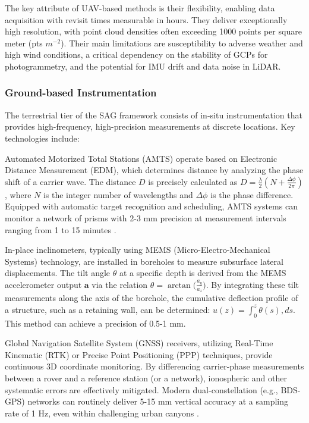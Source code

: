 \documentclass[preprint,11pt,authoryear,3p]{elsarticle}
\begin{document}
The key attribute of UAV-based methods is their flexibility, enabling data acquisition with revisit times measurable in hours. They deliver exceptionally high resolution, with point cloud densities often exceeding 1000 points per square meter (pts $m^{-2}$). Their main limitations are susceptibility to adverse weather and high wind conditions, a critical dependency on the stability of GCPs for photogrammetry, and the potential for IMU drift and data noise in LiDAR.

\subsubsection{Ground-based Instrumentation}

The terrestrial tier of the SAG framework consists of in-situ instrumentation that provides high-frequency, high-precision measurements at discrete locations. Key technologies include:

Automated Motorized Total Stations (AMTS) operate based on Electronic Distance Measurement (EDM), which determines distance by analyzing the phase shift of a carrier wave. The distance $D$ is precisely calculated as $D = \frac{\lambda}{2}\left ( N + \frac{\Delta\phi}{2\pi} \right )$, where $N$ is the integer number of wavelengths and $\Delta\phi$ is the phase difference. Equipped with automatic target recognition and scheduling, AMTS systems can monitor a network of prisms with 2-3 mm precision at measurement intervals ranging from 1 to 15 minutes \citep{Dunnicliff2018}.

In-place inclinometers, typically using MEMS (Micro-Electro-Mechanical Systems) technology, are installed in boreholes to measure subsurface lateral displacements. The tilt angle $\theta$ at a specific depth is derived from the MEMS accelerometer output $\mathbf{a}$ via the relation $\theta = \arctan \big(\tfrac{a_y}{a_z}\big)$. By integrating these tilt measurements along the axis of the borehole, the cumulative deflection profile of a structure, such as a retaining wall, can be determined: $u(z) = \int_0^z \theta(s),ds$. This method can achieve a precision of 0.5-1 mm.

Global Navigation Satellite System (GNSS) receivers, utilizing Real-Time Kinematic (RTK) or Precise Point Positioning (PPP) techniques, provide continuous 3D coordinate monitoring. By differencing carrier-phase measurements between a rover and a reference station (or a network), ionospheric and other systematic errors are effectively mitigated. Modern dual-constellation (e.g., BDS-GPS) networks can routinely deliver 5-15 mm vertical accuracy at a sampling rate of 1 Hz, even within challenging urban canyons \citep{Li2023}.
\end{document}

